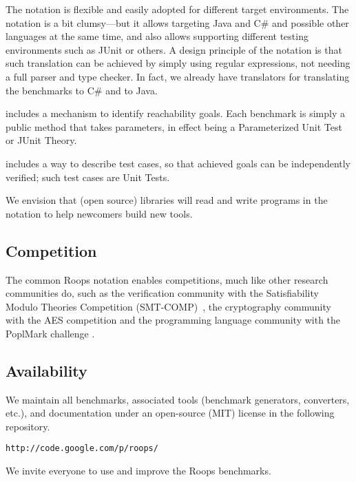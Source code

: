 The  notation is flexible and easily adopted for different target 
environments. The notation is a bit clumsy---but it allows targeting Java 
and C\# and possible other languages at the same time, and also allows supporting different testing 
environments such as JUnit or others. A design principle of the  
notation is that such translation can be achieved by simply using regular 
expressions, not needing a full parser and type checker. In fact, we
already have translators for translating the  benchmarks to C\#
and to Java.

 includes a mechanism to identify reachability goals. 
Each  benchmark is simply a public method that takes parameters,
in effect being a Parameterized Unit Test\cite{} or JUnit Theory\cite{}.

 includes a way to describe test cases, 
so that achieved goals can be independently verified;
such test cases are Unit Tests\cite{}.

We envision that (open source) libraries will read and write programs in the
 notation to help newcomers build new tools.


\subsection{Competition}

The common Roops notation enables competitions,
much like other research communities do, such as
the verification community with the Satisfiability Modulo Theories Competition
(SMT-COMP)~\cite{barrett05smt-comp,barrett05design},
the cryptography community with the AES competition
\cite{nechvatal01report,daemen02design} and the programming language community with the PoplMark challenge
\cite{aydemir05mechanized}.


\subsection{Availability}

We maintain all  benchmarks, associated tools (benchmark generators, 
converters, etc.), and documentation under an open-source (MIT) license in the
following repository.

\verb|http://code.google.com/p/roops/|

We invite everyone to use and improve the Roops benchmarks.